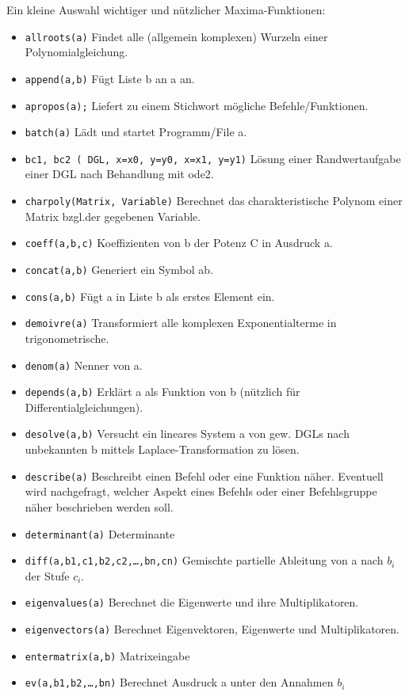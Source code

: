 \documentclass[ngerman,12pt]{scrartcl}
\begin{document}
Ein kleine Auswahl wichtiger und nützlicher Maxima-Funktionen:

\begin{itemize}
\item \texttt{allroots(a)} Findet alle (allgemein komplexen) Wurzeln
  einer  Polynomialgleichung.
\item \texttt{append(a,b)} Fügt Liste b an a an.
\item \texttt{apropos(a);} Liefert zu einem Stichwort mögliche Befehle/Funktionen.
\item \texttt{batch(a)} Lädt und startet Programm/File a.
\item \texttt{bc1, bc2 ( DGL, x=x0, y=y0, x=x1, y=y1)} Lösung einer
  Randwertaufgabe einer DGL nach Behandlung mit ode2.
\item \texttt{charpoly(Matrix, Variable)} Berechnet das
  charakteristische Polynom einer Matrix bzgl.\@ der gegebenen  Variable.
\item \texttt{coeff(a,b,c)} Koeffizienten von b der Potenz C in Ausdruck a.
\item \texttt{concat(a,b)} Generiert ein Symbol ab.
\item \texttt{cons(a,b)} Fügt a in Liste b als erstes Element ein.
\item \texttt{demoivre(a)} Transformiert alle komplexen Exponentialterme in trigonometrische.
\item \texttt{denom(a)} Nenner von a.
\item \texttt{depends(a,b)} Erklärt a als Funktion von b (nützlich für Differentialgleichungen).
\item \texttt{desolve(a,b)} Versucht ein lineares System a von gew. DGLs
  nach unbekannten b mittels Laplace-Transformation  zu lösen.
\item \texttt{describe(a)} Beschreibt einen Befehl oder eine Funktion
  näher.  Eventuell wird nachgefragt, welcher Aspekt eines Befehls oder
  einer Befehlsgruppe näher beschrieben  werden soll.
\item \texttt{determinant(a)} Determinante
\item \texttt{diff(a,b1,c1,b2,c2,\ldots,bn,cn)} Gemischte partielle Ableitung von a nach $b_i$ der Stufe $c_i$.
\item \texttt{eigenvalues(a)} Berechnet die Eigenwerte und ihre Multiplikatoren.
\item \texttt{eigenvectors(a)} Berechnet Eigenvektoren, Eigenwerte und  Multiplikatoren.
\item \texttt{entermatrix(a,b)} Matrixeingabe
\item \texttt{ev(a,b1,b2,\ldots,bn)} Berechnet Ausdruck a unter den Annahmen $b_i$

\end{itemize}
\end{document}
